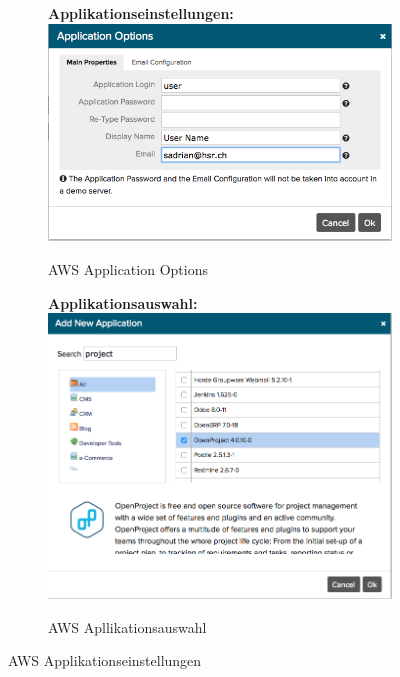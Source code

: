 \begin{figure}[!htbp]
  \centering
  \begin{subfigure}[b]{.49\textwidth}
\textbf{Applikationseinstellungen:}
\includegraphics[width=\textwidth]{./03_Analyse/03_Bitnami/images/aws_application_options}
\caption{AWS Application Options}
\end{subfigure}
  \hfill
\begin{subfigure}[b]{.49\textwidth}
\textbf{Applikationsauswahl:}
\includegraphics[width=\textwidth]{./03_Analyse/03_Bitnami/images/aws_add_application}
\caption{AWS Apllikationsauswahl}
\end{subfigure}
\caption{AWS Applikationseinstellungen}
\end{figure}

